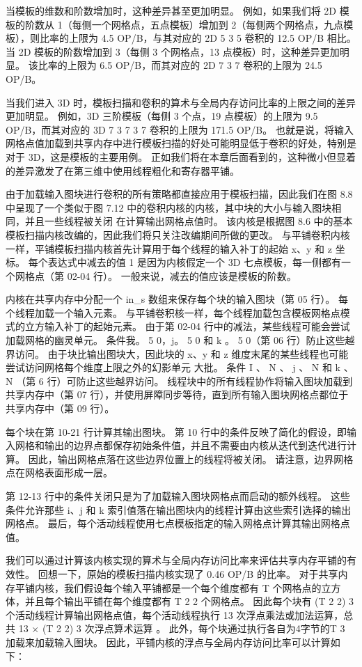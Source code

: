 当模板的维数和阶数增加时，这种差异甚至更加明显。 例如，如果我们将 2D 模板的阶数从 1（每侧一个网格点，五点模板）增加到 2（每侧两个网格点，九点模板），则比率的上限为 4.5 OP/B，与其对应的 2D 5 3 5 卷积的 12.5 OP/B 相比。 当 2D 模板的阶数增加到 3（每侧 3 个网格点，13 点模板）时，这种差异更加明显。 该比率的上限为 6.5 OP/B，而其对应的 2D 7 3 7 卷积的上限为 24.5 OP/B。

当我们进入 3D 时，模板扫描和卷积的算术与全局内存访问比率的上限之间的差异更加明显。 例如，3D 三阶模板（每侧 3 个点，19 点模板）的上限为 9.5 OP/B，而其对应的 3D 7 3 7 3 7 卷积的上限为 171.5 OP/B。 也就是说，将输入网格点值加载到共享内存中进行模板扫描的好处可能明显低于卷积的好处，特别是对于 3D，这是模板的主要用例。 正如我们将在本章后面看到的，这种微小但显着的差异激发了在第三维中使用线程粗化和寄存器平铺。

由于加载输入图块进行卷积的所有策略都直接应用于模板扫描，因此我们在图 8.8 中呈现了一个类似于图 7.12 中的卷积内核的内核，其中块的大小与输入图块相同，并且一些线程被关闭 在计算输出网格点值时。 该内核是根据图 8.6 中的基本模板扫描内核改编的，因此我们将只关注改编期间所做的更改。 与平铺卷积内核一样，平铺模板扫描内核首先计算用于每个线程的输入补丁的起始 x、y 和 z 坐标。 每个表达式中减去的值 1 是因为内核假定一个 3D 七点模板，每一侧都有一个网格点（第 02-04 行）。 一般来说，减去的值应该是模板的阶数。

内核在共享内存中分配一个 in\_s 数组来保存每个块的输入图块（第 05 行）。 每个线程加载一个输入元素。 与平铺卷积核一样，每个线程加载包含模板网格点模式的立方输入补丁的起始元素。 由于第 02-04 行中的减法，某些线程可能会尝试加载网格的幽灵单元。 条件我。 5 0，j。 5 0 和 k 。 5 0（第 06 行）防止这些越界访问。 由于块比输出图块大，因此块的 x、y 和 z 维度末尾的某些线程也可能尝试访问网格每个维度上限之外的幻影单元 大批。 条件 I 、 N 、 j 、 N 和 k 、 N （第 6 行）可防止这些越界访问。 线程块中的所有线程协作将输入图块加载到共享内存中（第 07 行），并使用屏障同步等待，直到所有输入图块网格点都位于共享内存中（第 09 行）。

每个块在第 10-21 行计算其输出图块。 第 10 行中的条件反映了简化的假设，即输入网格和输出的边界点都保存初始条件值，并且不需要由内核从迭代到迭代进行计算。 因此，输出网格点落在这些边界位置上的线程将被关闭。 请注意，边界网格点在网格表面形成一层。

第 12-13 行中的条件关闭只是为了加载输入图块网格点而启动的额外线程。 这些条件允许那些 i、j 和 k 索引值落在输出图块内的线程计算由这些索引选择的输出网格点。 最后，每个活动线程使用七点模板指定的输入网格点计算其输出网格点值。

我们可以通过计算该内核实现的算术与全局内存访问比率来评估共享内存平铺的有效性。 回想一下，原始的模板扫描内核实现了 0.46 OP/B 的比率。 对于共享内存平铺内核，我们假设每个输入平铺都是一个每个维度都有 T 个网格点的立方体，并且每个输出平铺在每个维度都有 T 2 2 个网格点。 因此每个块有 (T 2 2) 3 个活动线程计算输出网格点值，每个活动线程执行 13 次浮点乘法或加法运算，总共 13 × (T 2 2) 3 次浮点算术运算 。 此外，每个块通过执行各自为4字节的T 3 加载来加载输入图块。 因此，平铺内核的浮点与全局内存访问比率可以计算如下：

